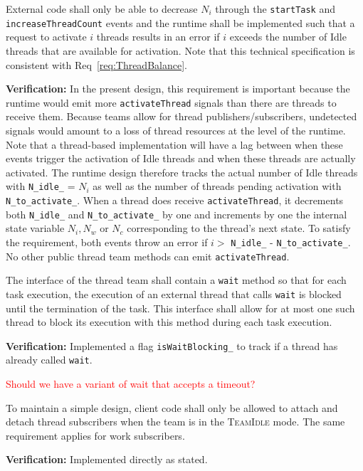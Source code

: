 \documentclass{article}
\newcommand{\TeamIdle}          {\textsc{TeamIdle}}
\begin{document}
\begin{spec}
External code shall only be able to decrease $N_i$ through the
\texttt{startTask} and \texttt{increaseThreadCount} events and the runtime shall
be implemented such that a request to activate $i$ threads results in an error
if $i$ exceeds the number of Idle threads that are available for activation.
Note that this technical specification is consistent with
Req~\ref{req:ThreadBalance}.
\end{spec}
\textbf{Verification:}\hspace{0.125in}  In the present design, this requirement
is important because the runtime would emit more \texttt{activateThread} signals
than there are threads to receive them.  Because teams allow for thread
publishers/subscribers, undetected signals would amount to a loss of thread
resources at the level of the runtime.  Note that a thread-based implementation
will have a lag between when these events trigger the activation of Idle threads
and when these threads are actually activated.  The runtime design therefore
tracks the actual number of Idle threads with \texttt{N\_idle\_} = $N_i$ as well
as the number of threads pending activation with \texttt{N\_to\_activate\_}.
When a thread does receive \texttt{activateThread}, it decrements both
\texttt{N\_idle\_} and \texttt{N\_to\_activate\_} by one and increments by one
the internal state variable $N_i, N_w$ or $N_c$ corresponding to the thread's
next state.  To satisfy the requirement, both events throw an error if $i > $
\texttt{N\_idle\_} - \texttt{N\_to\_activate\_}.  No other public thread team
methods can emit \texttt{activateThread}.

\begin{spec}
\label{spec:Runtime_OneWait}
The interface of the thread team shall contain a \texttt{wait} method so that
for each task execution, the execution of an external thread that calls
\texttt{wait} is blocked until the termination of the task.  This interface
shall allow for at most one such thread to block its execution with this method
during each task execution.
\end{spec}
\textbf{Verification:}\hspace{0.125in}  Implemented a flag
\texttt{isWaitBlocking\_} to track if a thread has already called \texttt{wait}.

\textcolor{red}{Should we have a variant of wait that accepts a timeout?}

\begin{spec}
To maintain a simple design, client code shall only be allowed to attach and
detach thread subscribers when the team is in the {\TeamIdle} mode.  The same
requirement applies for work subscribers.
\end{spec}
\textbf{Verification:}\hspace{0.125in} Implemented directly as stated.
\end{document}

